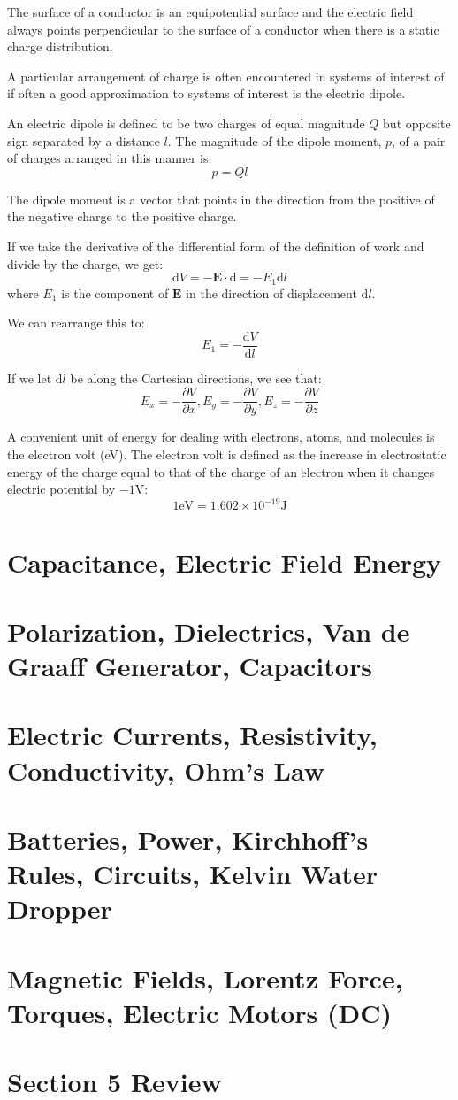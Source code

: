 \documentclass[../introphysics.tex]{subfiles}
\begin{document}
The surface of a conductor is an equipotential surface and the electric field
always points perpendicular to the surface of a conductor when there is a static charge distribution.

A particular arrangement of charge is often encountered in systems of interest of if 
often a good approximation to systems of interest is the electric dipole.

An electric dipole is defined to be two charges of equal magnitude $Q$ but 
opposite sign separated by a distance $l$. The magnitude of the dipole moment, $p$, of a pair 
of charges arranged in this manner is:
\[p=Ql\]

The dipole moment is a vector that points in the direction from the positive
of the negative charge to the positive charge.

If we take the derivative of the differential form of the definition of work and divide by the charge, we get:
\[\mathrm{d}V=-\textbf{E}\cdot\mathrm{d}=-E_1\mathrm{d}l\]
where $E_1$ is the component of $\textbf{E}$ in the direction of displacement $\mathrm{d}l$.

We can rearrange this to:
\[E_1=-\frac{\mathrm{d}V}{\mathrm{d}l}\]

If we let $\mathrm{d}l$ be along the Cartesian directions, we see that:
\[ E_x = -\frac{\partial V}{\partial x}, E_y=-\frac{\partial V}{\partial y}, E_z=-\frac{\partial V}{\partial z}\]

A convenient unit of energy for dealing with electrons, atoms, and molecules is the electron volt (eV).
The electron volt is defined as the increase in electrostatic energy of the charge
equal to that of the charge of an electron when it changes electric potential by $-1$V:
\[ 1\text{eV}=1.602\times10^{-19}\text{J}\]

\section{Capacitance, Electric Field Energy}
\section{Polarization, Dielectrics, Van de Graaff Generator, Capacitors}
\section{Electric Currents, Resistivity, Conductivity, Ohm's Law}
\section{Batteries, Power, Kirchhoff's Rules, Circuits, Kelvin Water Dropper}
\section{Magnetic Fields, Lorentz Force, Torques, Electric Motors (DC)}
\section{Section 5 Review}
\end{document}
